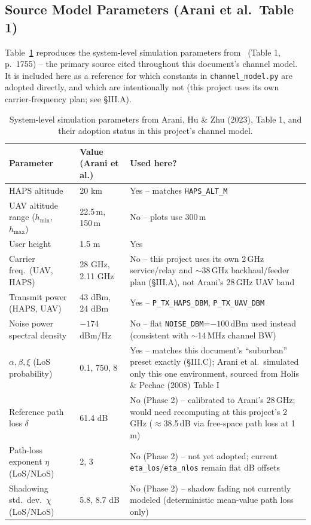 \subsection{Source Model Parameters (Arani et al.\ Table 1)}
\label{sec:app-arani-table1}

Table~\ref{table:app-arani-table1} reproduces the system-level simulation parameters
from~\cite{arani2023} (Table 1, p.\ 1755) -- the primary source cited throughout this
document's channel model. It is included here as a reference for which constants
in \texttt{channel\_model.py} are adopted directly, and which are intentionally
not (this project uses its own carrier-frequency plan; see \S III.A).

\begin{table}[htbp]
\centering
\caption{System-level simulation parameters from Arani, Hu \& Zhu (2023), Table 1, and their adoption status in this project's channel model.}
\label{table:app-arani-table1}
\small
\begin{tabular}{lll}
\hline
\textbf{Parameter} & \textbf{Value (Arani et al.)} & \textbf{Used here?} \\
\hline
HAPS altitude & 20 km & Yes -- matches \texttt{HAPS\_ALT\_M} \\
UAV altitude range ($h_{\min}$, $h_{\max}$) & 22.5\,m, 150\,m & No -- plots use 300\,m \\
User height & 1.5 m & Yes \\
Carrier freq.\ (UAV, HAPS) & 28 GHz, 2.11 GHz & No -- this project uses its own 2\,GHz service/relay and $\sim$38\,GHz backhaul/feeder plan (\S III.A), not Arani's 28\,GHz UAV band \\
Transmit power (HAPS, UAV) & 43 dBm, 24 dBm & Yes -- \texttt{P\_TX\_HAPS\_DBM}, \texttt{P\_TX\_UAV\_DBM} \\
Noise power spectral density & $-174$ dBm/Hz & No -- flat \texttt{NOISE\_DBM}=$-100$\,dBm used instead (consistent with $\sim$14\,MHz channel BW) \\
$\alpha,\beta,\xi$ (LoS probability) & 0.1, 750, 8 & Yes -- matches this document's ``suburban'' preset exactly (\S III.C); Arani et al.\ simulated only this one environment, sourced from Holis \& Pechac (2008) Table I \\
Reference path loss $\delta$ & 61.4 dB & No (Phase 2) -- calibrated to Arani's 28\,GHz; would need recomputing at this project's 2\,GHz ($\approx$38.5\,dB via free-space path loss at 1\,m) \\
Path-loss exponent $\eta$ (LoS/NLoS) & 2, 3 & No (Phase 2) -- not yet adopted; current \texttt{eta\_los}/\texttt{eta\_nlos} remain flat dB offsets \\
Shadowing std.\ dev.\ $\chi$ (LoS/NLoS) & 5.8, 8.7 dB & No (Phase 2) -- shadow fading not currently modeled (deterministic mean-value path loss only) \\
\hline
\end{tabular}
\end{table}

